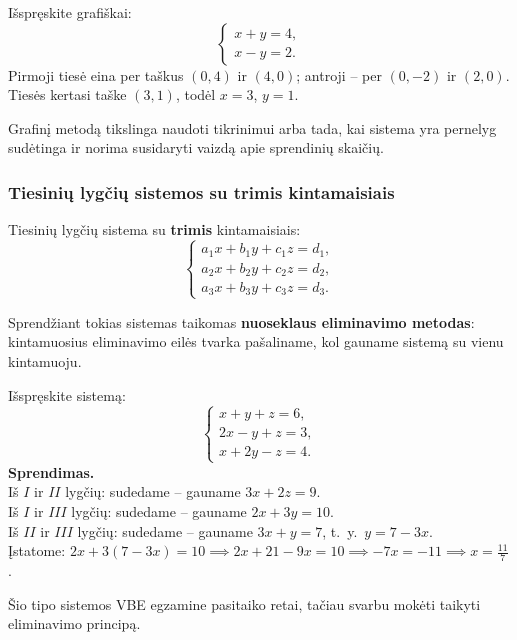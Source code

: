 \begin{example}
Išspręskite grafiškai:
\[
  \begin{cases}
    x + y = 4,\\
    x - y = 2.
  \end{cases}
\]
Pirmoji tiesė eina per taškus $(0,4)$ ir $(4,0)$; antroji -- per $(0,-2)$ ir $(2,0)$. Tiesės kertasi taške $(3,1)$, todėl $x = 3$, $y = 1$.
\end{example}

\begin{remark}
Grafinį metodą tikslinga naudoti tikrinimui arba tada, kai sistema yra pernelyg sudėtinga ir norima susidaryti vaizdą apie sprendinių skaičių.
\end{remark}

\subsubsection*{Tiesinių lygčių sistemos su trimis kintamaisiais}

\begin{definition}
Tiesinių lygčių sistema su \textbf{trimis} kintamaisiais:
\[
  \begin{cases}
    a_1 x + b_1 y + c_1 z = d_1,\\
    a_2 x + b_2 y + c_2 z = d_2,\\
    a_3 x + b_3 y + c_3 z = d_3.
  \end{cases}
\]
\end{definition}

Sprendžiant tokias sistemas taikomas \textbf{nuoseklaus eliminavimo metodas}: kintamuosius eliminavimo eilės tvarka pašaliname, kol gauname sistemą su vienu kintamuoju.

\begin{example}
Išspręskite sistemą:
\[
  \begin{cases}
    x + y + z = 6,\\
    2x - y + z = 3,\\
    x + 2y - z = 4.
  \end{cases}
\]
\textbf{Sprendimas.}\\
Iš $I$ ir $II$ lygčių: sudedame -- gauname $3x + 2z = 9$.\\
Iš $I$ ir $III$ lygčių: sudedame -- gauname $2x + 3y = 10$.\\
Iš $II$ ir $III$ lygčių: sudedame -- gauname $3x + y = 7$, t.~y.\ $y = 7-3x$.\\
Įstatome: $2x + 3(7-3x) = 10 \implies 2x + 21 - 9x = 10 \implies -7x = -11 \implies x = \frac{11}{7}$.

\medskip

\begin{remark}
Šio tipo sistemos VBE egzamine pasitaiko retai, tačiau svarbu mokėti taikyti eliminavimo principą.
\end{remark}
\end{example}

